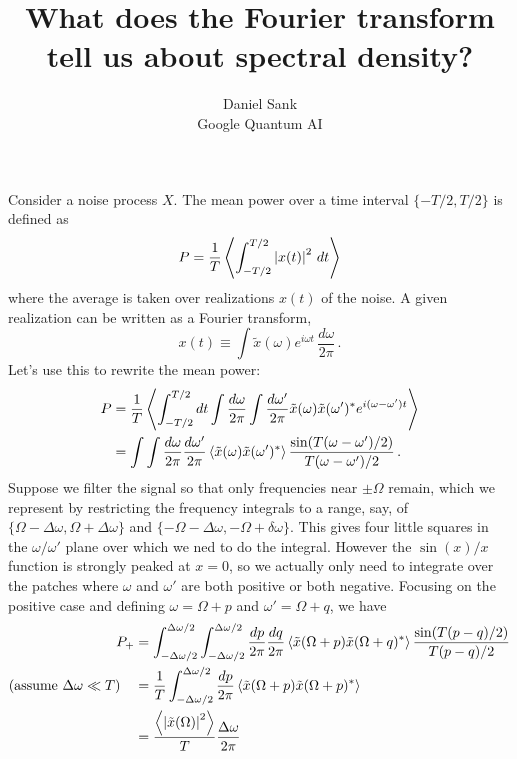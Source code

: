\documentclass{article}
\title{What does the Fourier transform tell us about spectral density?}
\author{Daniel Sank \\ \small{Google Quantum AI}}
\begin{document}
\maketitle


Consider a noise process $X$.
The mean power over a time interval $\{-T/2,T/2\}$ is defined as
\begin{equation}
P = \frac{1}{T} \left \langle \int_{-T/2}^{T/2} \left \lvert x(t) \right \rvert^2 \, dt \right \rangle
\end{equation}
where the average is taken over realizations $x(t)$ of the noise.
A given realization can be written as a Fourier transform,
\begin{equation}
x(t) \equiv
\int \tilde{x}(\omega) e^{i \omega t} \, \frac{d \omega}{2\pi} \, .
\end{equation}
Let's use this to rewrite the mean power:
\begin{align}
P
&= \frac{1}{T}\left \langle 
\int_{-T/2}^{T/2} dt
\int \frac{d\omega}{2\pi}
\int \frac{d\omega'}{2\pi}
\tilde{x}(\omega) \tilde{x}(\omega')^*
e^{i(\omega - \omega')t} \right \rangle \nonumber \\
&= \int \int \frac{d\omega}{2\pi} \frac{d\omega'}{2\pi}
\left \langle \tilde{x}(\omega)\tilde{x}(\omega')^* \right \rangle
\frac{\sin(T(\omega - \omega')/2)}{T (\omega - \omega')/2} \, .
\end{align}
Suppose we filter the signal so that only frequencies near $\pm \Omega$ remain, which we represent by restricting the frequency integrals to a range, say, of $\{\Omega-\Delta \omega, \Omega+\Delta \omega\}$ and $\{-\Omega - \Delta \omega, -\Omega + \delta \omega\}$.
This gives four little squares in the $\omega/\omega'$ plane over which we ned to do the integral.
However the $\sin(x)/x$ function is strongly peaked at $x=0$, so we actually only need to integrate over the patches where $\omega$ and $\omega'$ are both positive or both negative.
Focusing on the positive case and defining $\omega = \Omega + p$ and $\omega' = \Omega + q$, we have
\begin{align}
P_+ &=
\int_{-\Delta \omega/2}^{\Delta\omega/2}
\int_{-\Delta \omega/2}^{\Delta\omega/2}
\frac{dp}{2\pi} \frac{dq}{2\pi}
\left \langle \tilde{x}(\Omega+p)\tilde{x}(\Omega+q)^* \right \rangle \frac{\sin(T(p-q)/2)}{T(p-q)/2} \nonumber \\
(\text{assume }\Delta \omega \ll T) \quad &=
\frac{1}{T} \int_{-\Delta \omega/2}^{\Delta \omega / 2}
\frac{dp}{2\pi} \left \langle \tilde{x}(\Omega + p) \tilde{x}(\Omega + p)^* \right \rangle \nonumber \\
&= \frac{\left \langle \left \lvert \tilde{x}(\Omega) \right \rvert^2 \right \rangle}{T} \frac{\Delta \omega}{2 \pi}
\end{align}
\end{document}
